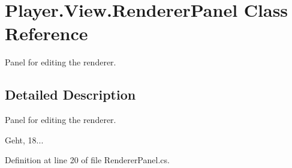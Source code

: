 \section{Player.\-View.\-Renderer\-Panel Class Reference}
\label{class_player_1_1_view_1_1_renderer_panel}


Panel for editing the renderer.  




\subsection{Detailed Description}
Panel for editing the renderer. 

Geht, 18... 

Definition at line 20 of file Renderer\-Panel.\-cs.

